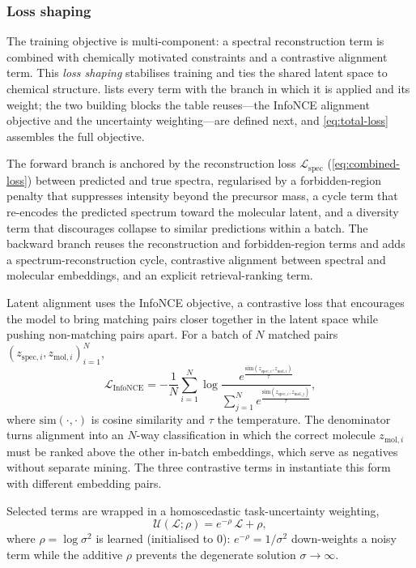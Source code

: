 \subsubsection{Loss shaping}

The training objective is multi-component: a spectral reconstruction term is combined with chemically motivated constraints and a contrastive alignment term. This \emph{loss shaping} stabilises training and ties the shared latent space to chemical structure.  lists every term with the branch in which it is applied and its weight; the two building blocks the table reuses---the InfoNCE alignment objective and the uncertainty weighting---are defined next, and \cref{eq:total-loss} assembles the full objective.

The forward branch is anchored by the reconstruction loss $\mathcal{L}_{\mathrm{spec}}$ (\cref{eq:combined-loss}) between predicted and true spectra, regularised by a forbidden-region penalty that suppresses intensity beyond the precursor mass, a cycle term that re-encodes the predicted spectrum toward the molecular latent, and a diversity term that discourages collapse to similar predictions within a batch. The backward branch reuses the reconstruction and forbidden-region terms and adds a spectrum-reconstruction cycle, contrastive alignment between spectral and molecular embeddings, and an explicit retrieval-ranking term.

Latent alignment uses the InfoNCE objective, a contrastive loss that encourages the model to bring matching pairs closer together in the latent space while pushing non-matching pairs apart. For a batch of $N$ matched pairs $(z_{\mathrm{spec},i}, z_{\mathrm{mol},i})_{i=1}^{N}$,
\begin{equation}
    \label{eq:infonce}
    \mathcal{L}_{\mathrm{InfoNCE}} = -\frac{1}{N}\sum_{i=1}^{N} \log \frac{e^{\frac{\mathrm{sim}(z_{\mathrm{spec},i}, z_{\mathrm{mol},i})}{\tau}}}{\sum_{j=1}^{N} e^{\frac{\mathrm{sim}(z_{\mathrm{spec},i}, z_{\mathrm{mol},j})}{\tau}}},
\end{equation}
where $\mathrm{sim}(\cdot,\cdot)$ is cosine similarity and $\tau$ the temperature. 
The denominator turns alignment into an $N$-way classification in which the correct molecule $z_{\mathrm{mol},i}$ must be ranked above the other in-batch embeddings, which serve as negatives without separate mining. 
The three contrastive terms in  instantiate this form with different embedding pairs.

Selected terms are wrapped in a homoscedastic task-uncertainty weighting,
\begin{equation}
    \label{eq:uncertainty-wrapper}
    \mathcal{U}(\mathcal{L};\rho) = e^{-\rho}\,\mathcal{L} + \rho,
\end{equation}
where $\rho = \log\sigma^2$ is learned (initialised to $0$): $e^{-\rho}=1/\sigma^2$ down-weights a noisy term while the additive $\rho$ prevents the degenerate solution $\sigma\!\to\!\infty$.

